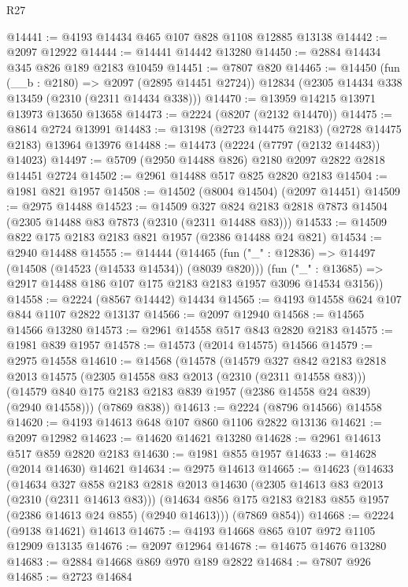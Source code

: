 \begin{lexlean}{R27}
\begin{coremodule}
@14441 := @4193 @14434 @465 @107 @828 @1108 @12885 @13138
@14442 := @2097 @12922
@14444 := @14441 @14442 @13280
@14450 := @2884 @14434 @345 @826 @189 @2183 @10459
@14451 := @7807 @820
@14465 := @14450
    (fun (__b : @2180) => @2097 (@2895 @14451 @2724))
    @12834
    (@2305 @14434 @338 @13459 (@2310 (@2311 @14434 @338)))
@14470 := @13959 @14215 @13971 @13973 @13650 @13658
@14473 := @2224 (@8207 (@2132 @14470))
@14475 := @8614 @2724 @13991
@14483 := @13198 (@2723 @14475 @2183) (@2728 @14475 @2183) @13964 @13976
@14488 := @14473 (@2224 (@7797 (@2132 @14483)) @14023)
@14497 := @5709 (@2950 @14488 @826) @2180 @2097 @2822 @2818 @14451 @2724
@14502 := @2961 @14488 @517 @825 @2820 @2183
@14504 := @1981 @821 @1957
@14508 := @14502 (@8004 @14504) (@2097 @14451)
@14509 := @2975 @14488
@14523 := @14509
    @327
    @824
    @2183
    @2818
    @7873
    @14504
    (@2305 @14488 @83 @7873 (@2310 (@2311 @14488 @83)))
@14533 := @14509 @822 @175 @2183 @2183 @821 @1957 (@2386 @14488 @24 @821)
@14534 := @2940 @14488
@14555 := @14444
    (@14465
      (fun ("_" : @12836) => @14497 (@14508 (@14523 (@14533 @14534)) (@8039 @820)))
      (fun ("_" : @13685) => @2917 @14488 @186 @107 @175 @2183 @2183 @1957 @3096 @14534 @3156))
@14558 := @2224 (@8567 @14442) @14434
@14565 := @4193 @14558 @624 @107 @844 @1107 @2822 @13137
@14566 := @2097 @12940
@14568 := @14565 @14566 @13280
@14573 := @2961 @14558 @517 @843 @2820 @2183
@14575 := @1981 @839 @1957
@14578 := @14573 (@2014 @14575) @14566
@14579 := @2975 @14558
@14610 := @14568
    (@14578
      (@14579
        @327
        @842
        @2183
        @2818
        @2013
        @14575
        (@2305 @14558 @83 @2013 (@2310 (@2311 @14558 @83)))
        (@14579 @840 @175 @2183 @2183 @839 @1957 (@2386 @14558 @24 @839) (@2940 @14558)))
      (@7869 @838))
@14613 := @2224 (@8796 @14566) @14558
@14620 := @4193 @14613 @648 @107 @860 @1106 @2822 @13136
@14621 := @2097 @12982
@14623 := @14620 @14621 @13280
@14628 := @2961 @14613 @517 @859 @2820 @2183
@14630 := @1981 @855 @1957
@14633 := @14628 (@2014 @14630) @14621
@14634 := @2975 @14613
@14665 := @14623
    (@14633
      (@14634
        @327
        @858
        @2183
        @2818
        @2013
        @14630
        (@2305 @14613 @83 @2013 (@2310 (@2311 @14613 @83)))
        (@14634 @856 @175 @2183 @2183 @855 @1957 (@2386 @14613 @24 @855) (@2940 @14613)))
      (@7869 @854))
@14668 := @2224 (@9138 @14621) @14613
@14675 := @4193 @14668 @865 @107 @972 @1105 @12909 @13135
@14676 := @2097 @12964
@14678 := @14675 @14676 @13280
@14683 := @2884 @14668 @869 @970 @189 @2822
@14684 := @7807 @926
@14685 := @2723 @14684

\end{coremodule}
\end{lexlean}
